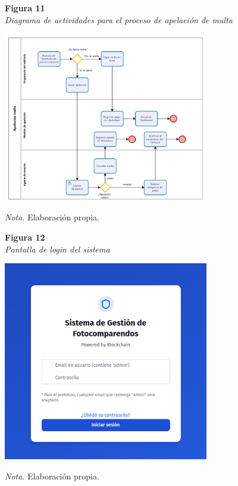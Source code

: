 \documentclass[
    letterpaper, 
    man,   
    spanish,
    12pt,
    donotrepeattitle,
    floatsintext,
    hidelinks %
]{apa7}
\begin{document}
\begin{figure}[htbp]
    \begin{flushleft}
        \textbf{Figura 11}\\
        \textit{Diagrama de actividades para el proceso de apelación de multa}
    \end{flushleft}
    \centering
    \includegraphics[width=0.8\textwidth]{Images/ActApelacion.png}
    \vspace{0.5em}
    \begin{flushleft}
        \textit{Nota.} Elaboración propia.
    \end{flushleft}
    \label{fig:diagrama_apelacion_2}
\end{figure}

\begin{figure}[htbp]
    \begin{flushleft}
        \textbf{Figura 12}\\
        \textit{Pantalla de login del sistema}
    \end{flushleft}
    \centering
    \includegraphics[width=0.8\textwidth]{Images/UI1.png}
    \vspace{0.5em}
    \begin{flushleft}
        \textit{Nota.} Elaboración propia.
    \end{flushleft}
    \label{fig:login}
\end{figure}
\end{document}
